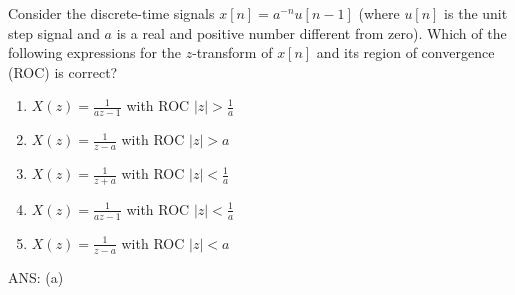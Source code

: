 \begin{q}{}
Consider the discrete-time signals $x[n] = a^{-n}u[n-1]$ (where $u[n]$ is the unit step signal and $a$ is a real and positive number different from zero). Which of the following expressions for the $z$-transform of $x[n]$ and its region of convergence (ROC) is correct?

\begin{enumerate}[label=(\alph*)]
    \item $X(z) = \frac{1}{az-1}$ with ROC $\lvert z \rvert > \frac{1}{a}$
    \item $X(z) = \frac{1}{z-a}$ with ROC $\lvert z \rvert > a$
    \item $X(z) = \frac{1}{z+a}$ with ROC $\lvert z \rvert < \frac{1}{a}$
    \item $X(z) = \frac{1}{az-1}$ with ROC $\lvert z \rvert < \frac{1}{a}$
    \item $X(z) = \frac{1}{z-a}$ with ROC $\lvert z \rvert < a$
\end{enumerate}
\begin{flushright}
\begin{blueenv}
    ANS: (a)
\end{blueenv}
\end{flushright}
\end{q}
